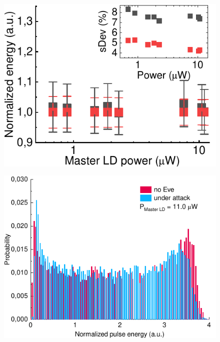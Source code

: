 \begin{figure}%
	\includegraphics[width=\linewidth]{images/area_under_attack.pdf}
	\caption{}
\end{figure}
\label{fig:area}

\begin{figure}
	\includegraphics[width=\linewidth]{images/hist_attack_11.pdf}
	\caption{}
\end{figure}

